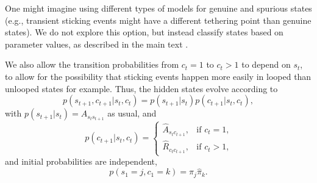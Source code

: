One might imagine using different types of models for genuine and
spurious states (e.g., transient sticking events might have a
different tethering point than genuine states). We do not explore this
option, but instead classify states based on parameter values, as
described in the main text \cite{maintext}.

We also allow the transition probabilities from $c_t=1$ to $c_t>1$ to
depend on $s_t$, to allow for the possibility that sticking events
happen more easily in looped than unlooped states for example. Thus,
the hidden states evolve according to
\begin{equation}
  p(s_{t+1},c_{t+1}|s_t,c_t)=p(s_{t+1}|s_t)p(c_{t+1}|s_t,c_t),
\end{equation}
with $p(s_{t+1}|s_t)=A_{s_ts_{t+1}}$ as usual, and 
\begin{equation}
  p(c_{t+1}|s_t,c_t)=\left\{
  \begin{array}{ll}
    \hat A_{s_tc_{t+1}},&\text{if $c_t=1$,}\\
    \hat R_{c_tc_{t+1}},&\text{if $c_t>1$,}    
  \end{array}\right.
\end{equation}
and initial probabilities are independent,
\begin{equation}
  p(s_1=j,c_1=k)=\pi_j\hat\pi_k.
\end{equation}
